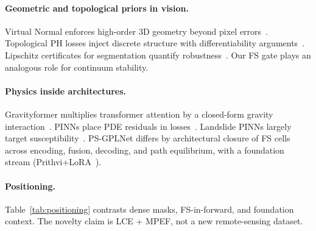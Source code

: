\documentclass[10pt,twocolumn,letterpaper]{article}
\begin{document}
\paragraph{Geometric and topological priors in vision.}
Virtual Normal enforces high-order 3D geometry beyond pixel errors~\cite{yin2021virtualnormal}. Topological PH losses inject discrete structure with differentiability arguments~\cite{clough2022topological}. Lipschitz certificates for segmentation quantify robustness~\cite{lipschitzseg2025,altinses2026layerlipschitz}. Our FS gate plays an analogous role for continuum stability.

\paragraph{Physics inside architectures.}
Gravityformer multiplies transformer attention by a closed-form gravity interaction~\cite{wang2025gravityformer}. PINNs place PDE residuals in losses~\cite{raissi2019pinn,karniadakis2021physics}. Landslide PINNs largely target susceptibility~\cite{dahal2024pinn,liu2023physics,maurya2024pgml}. PS-GPLNet differs by architectural closure of FS cells across encoding, fusion, decoding, and path equilibrium, with a foundation stream (Prithvi+LoRA~\cite{szink2024prithvi,houlsby2019lora}).

\paragraph{Positioning.}
Table~\ref{tab:positioning} contrasts dense masks, FS-in-forward, and foundation context. The novelty claim is LCE + MPEF, not a new remote-sensing dataset.

\begin{table}[t]
\centering
\caption{Conceptual positioning for dense multimodal prediction.}
\label{tab:positioning}
\end{table}
\end{document}
